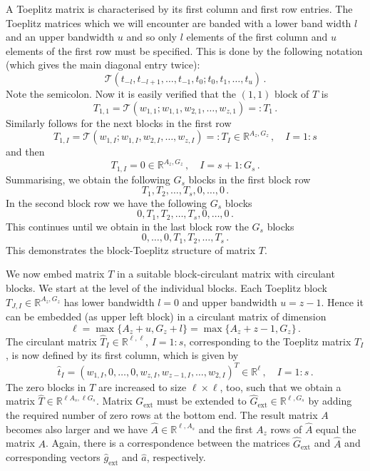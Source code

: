 \documentclass[a4,12pt]{article}
\newcommand{\Real}[1]{\mathbb{R}^{#1}}
\newcommand{\Toep}{\mathcal{T}}
\begin{document}
A Toeplitz matrix is characterised by its first column and first row
entries. The Toeplitz matrices which we will encounter are banded with a lower
band width $l$ and an upper bandwidth $u$ and so only $l$ elements of the first
column and $u$ elements of the first row must be specified. This is done by the
following notation (which gives the main diagonal entry twice):
\[
\Toep(t_{-l},t_{-l+1},\dots,t_{-1},t_0 \mathbf{;} t_0, t_1, \dots, t_u)\,.
\]
Note the semicolon.
Now it is easily verified that the $(1,1)$ block of $T$ is
\[ 
T_{1,1}=\Toep(w_{1,1}; w_{1,1},w_{2,1}, \dots, w_{z,1})=:T_1\,.
\]
Similarly follows for the next blocks in the first row
\[ 
T_{1,I}=\Toep(w_{1,I}; w_{1,I}, w_{2,I}, \dots, w_{z,I})=:T_I\in\Real{A_z,G_z}\,,
\quad I=1:s
\]
and then
\[
T_{1,I}=0\in\Real{A_z,G_z}\,,\quad I=s+1:G_s\,.
\]
Summarising, we obtain the following $G_s$ blocks in the first block row
\[
T_1, T_2,\dots, T_s,0,\dots,0\,.
\]
In the second block row we have the following $G_s$ blocks
\[
0, T_1, T_2,\dots, T_s, 0,\dots, 0\,.
\]
This continues until we obtain in the last block row the $G_s$ blocks
\[
0,\dots,0,T_1, T_2,\dots, T_s\,.
\]
This demonstrates the block-Toeplitz structure of matrix $T$.

We now embed matrix $T$ in a suitable block-circulant matrix with circulant
blocks. We start at the level of the individual blocks. Each Toeplitz block
$T_{J,I}\in\Real{A_z,G_z}$ has lower bandwidth $l=0$ and upper bandwidth
$u=z-1$. Hence it can be embedded (as upper left block) in a circulant matrix of
dimension
\[
\ell=\max\{A_z+u,G_z+l\}= \max\{A_z+z-1,G_z\}\,.
\]
The circulant matrix $\hat{T}_I\in\Real{\ell,\ell}$, $I=1:s$, corresponding to
the Toeplitz matrix $T_I$, is now defined by
its first column, which is given by
\[
\hat{t}_I=(w_{1,I},0,\dots,0,w_{z,I}, w_{z-1,I},\dots,w_{2,I})^T
\in\Real{\ell}\,, \quad I=1:s\,.
\]
The zero blocks in $T$ are increased to size $\ell\times\ell$, too, such that we
obtain a matrix $\hat{T}\in\Real{\ell A_s,\ell G_s}$.
Matrix $G_\text{ext}$ must be extended to $\hat{G}_\text{ext}\in\Real{\ell,G_s}$
by adding the required number of zero rows at the bottom end. 
The result matrix $A$ becomes also
larger and we have $\hat{A}\in\Real{\ell,A_s}$ and the first $A_z$ rows of
$\hat{A}$ equal the matrix $A$. Again, there is a correspondence between the
matrices $\hat{G}_\text{ext}$ and $\hat{A}$ and corresponding vectors
$\hat{g}_\text{ext}$ and $\hat{a}$, respectively. 
\end{document}
